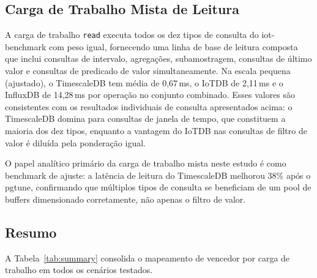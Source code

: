 \subsection{Carga de Trabalho Mista de Leitura}

A carga de trabalho \texttt{read} executa todos os dez tipos de consulta do iot-benchmark com
peso igual, fornecendo uma linha de base de leitura composta que inclui consultas de intervalo,
agregações, subamostragem, consultas de último valor e consultas de predicado de valor
simultaneamente. Na escala pequena (ajustado), o TimescaleDB tem média de 0,67\,ms, o IoTDB
de 2,11\,ms e o InfluxDB de 14,28\,ms por operação no conjunto combinado. Esses valores são
consistentes com os resultados individuais de consulta apresentados acima: o TimescaleDB
domina para consultas de janela de tempo, que constituem a maioria dos dez tipos, enquanto a
vantagem do IoTDB nas consultas de filtro de valor é diluída pela ponderação igual.

O papel analítico primário da carga de trabalho mista neste estudo é como benchmark de ajuste:
a latência de leitura do TimescaleDB melhorou 38\% após o pgtune, confirmando que múltiplos
tipos de consulta se beneficiam de um pool de buffers dimensionado corretamente, não apenas o
filtro de valor.

\subsection{Resumo}
\label{sec:results-summary}

A Tabela~\ref{tab:summary} consolida o mapeamento de vencedor por carga de trabalho em todos
os cenários testados.

